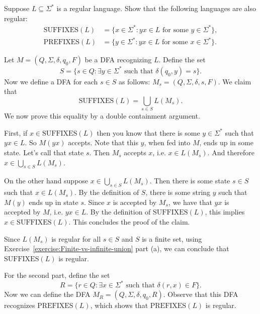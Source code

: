 \begin{flex}
\label{grp:exercise:Regularity-of-suffixes-and-prefixes}

\begin{exercise}
\label{exercise:Regularity-of-suffixes-and-prefixes}
Suppose $L \subseteq \Sigma^*$ is a regular language. 
Show that the following languages are also regular:
\[ \begin{align*}
\text{SUFFIXES}(L) & = \{x \in \Sigma^* : \text{$yx \in L$ for some $y \in \Sigma^*$}\},  \\
\text{PREFIXES}(L) & = \{y \in \Sigma^* : \text{$yx \in L$ for some $x \in  \Sigma^*$}\}.
\end{align*} \]

\end{exercise}

\begin{solution}
\label{sol:deterministic-finite-automata::define}
Let $M = (Q, \Sigma, \delta, q_0, F)$ be a DFA recognizing $L$. Define the set 
\[
    S = \{s \in Q: \exists y \in \Sigma^* \text{ such that } \delta(q_0,y) = s\}.
\]
Now we define a DFA for each $s \in S$ as follows: $M_s = (Q, \Sigma, \delta, s, F)$. We claim that 
\[
\text{SUFFIXES}(L) = \bigcup_{s \in S} L(M_s).
\]
We now prove this equality by a double containment argument.

First, if $x \in \text{SUFFIXES}(L)$ then you know that there is some $y \in \Sigma^*$ such that $yx \in L$. So $M(yx)$ accepts. Note that this $y$, when fed into $M$, ends up in some state. Let's call that state $s$. Then $M_s$ accepts $x$, i.e. $x \in L(M_s)$. And therefore $x \in \bigcup_{s \in S} L(M_s)$.

On the other hand suppose  $x \in \bigcup_{s \in S} L(M_s)$. Then there is some state $s \in S$ such that $x \in L(M_s)$. By the definition of $S$, there is some string $y$ such that $M(y)$ ends up in state $s$. Since $x$ is accepted by $M_s$, we have that $yx$ is accepted by $M$, i.e. $yx \in L$. By the definition of $\text{SUFFIXES}(L)$, this implies $x \in \text{SUFFIXES}(L)$. This concludes the proof of the claim.

Since $L(M_s)$ is regular for all $s \in S$ and $S$ is a finite set, using Exercise~\ref{exercise:Finite-vs-infinite-union} part (a), we can conclude that $\text{SUFFIXES}(L)$ is regular.

For the second part, define the set
\[
    R = \{r \in Q : \exists x \in \Sigma^* \text{ such that } \delta(r, x) \in F\}.
\]
Now we can define the DFA $M_R = (Q, \Sigma, \delta, q_0, R)$. Observe that this DFA recognizes $\text{PREFIXES}(L)$, which shows that $\text{PREFIXES}(L)$ is regular.

\end{solution}
\end{flex}

